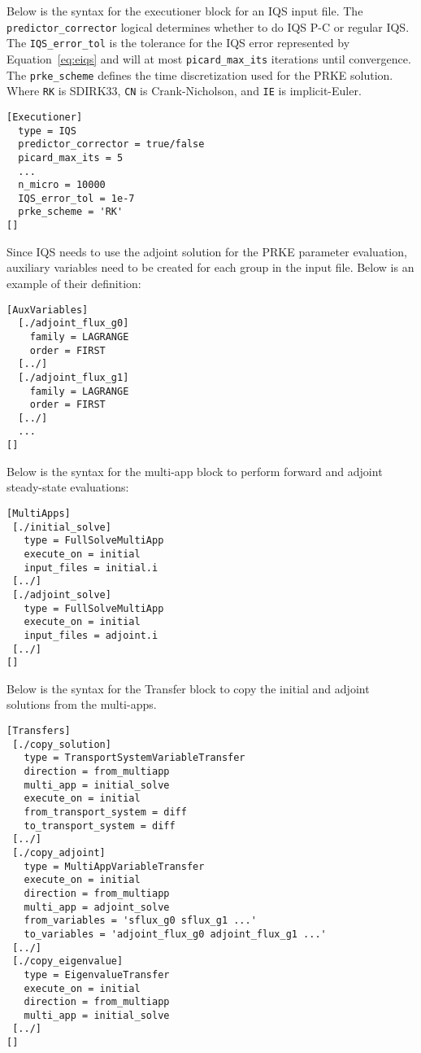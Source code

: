 \documentclass[12pt]{scrartcl}
\newcommand{\eqt}[1]{Equation~\ref{#1}}                     %
\begin{document}
Below is the syntax for the executioner block for an IQS input file.  The \texttt{predictor\_corrector} logical determines whether to do IQS P-C or regular IQS.  The \texttt{IQS\_error\_tol} is the tolerance for the IQS error represented by \eqt{eq:eiqs} and will at most \texttt{picard\_max\_its} iterations until convergence.  The \texttt{prke\_scheme} defines the time discretization used for the PRKE solution. Where \texttt{RK} is SDIRK33, \texttt{CN} is Crank-Nicholson, and \texttt{IE} is implicit-Euler.
\begin{lstlisting}
[Executioner]
  type = IQS
  predictor_corrector = true/false
  picard_max_its = 5
  ...
  n_micro = 10000
  IQS_error_tol = 1e-7
  prke_scheme = 'RK'
[]
\end{lstlisting}

Since IQS needs to use the adjoint solution for the PRKE parameter evaluation, auxiliary variables need to be created for each group in the input file.  Below is an example of their definition: 
\begin{lstlisting}
[AuxVariables]
  [./adjoint_flux_g0] 
    family = LAGRANGE
    order = FIRST
  [../]
  [./adjoint_flux_g1]
    family = LAGRANGE
    order = FIRST
  [../]
  ...
[]
\end{lstlisting}

Below is the syntax for the multi-app block to perform forward and adjoint steady-state evaluations:
\begin{lstlisting}
[MultiApps]
 [./initial_solve]
   type = FullSolveMultiApp
   execute_on = initial
   input_files = initial.i
 [../]
 [./adjoint_solve]
   type = FullSolveMultiApp
   execute_on = initial
   input_files = adjoint.i
 [../]
[]
\end{lstlisting}

Below is the syntax for the Transfer block to copy the initial and adjoint solutions from the multi-apps.
\begin{lstlisting}
[Transfers]
 [./copy_solution]
   type = TransportSystemVariableTransfer
   direction = from_multiapp
   multi_app = initial_solve
   execute_on = initial
   from_transport_system = diff
   to_transport_system = diff
 [../]
 [./copy_adjoint]
   type = MultiAppVariableTransfer
   execute_on = initial
   direction = from_multiapp
   multi_app = adjoint_solve
   from_variables = 'sflux_g0 sflux_g1 ...'
   to_variables = 'adjoint_flux_g0 adjoint_flux_g1 ...'
 [../]
 [./copy_eigenvalue]
   type = EigenvalueTransfer
   execute_on = initial
   direction = from_multiapp
   multi_app = initial_solve
 [../]
[]
\end{lstlisting}
\end{document}
